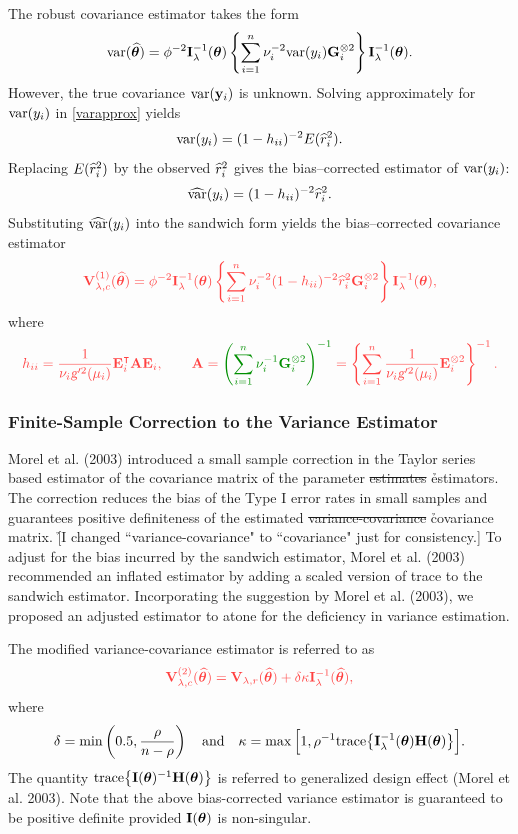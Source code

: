 The robust covariance estimator takes the form
\begin{equation*}
\text{var}(\widehat{\bm\theta}) 
= \phi^{-2}\mathbf{I}_\lambda^{-1}(\bm\theta)\left\{\sum_{i=1}^n \nu_i^{-2}\text{var}(y_i)\mathbf{G}_i^{\otimes 2}\right\}\mathbf{I}_\lambda^{-1}(\bm\theta). 
\label{eq: var-approx}
\end{equation*}
However, the true covariance $\text{var}(\mathbf{y}_i)$ is unknown. Solving approximately for $\text{var}(y_i)$ in \eqref{varapprox} yields
$$
\text{var}(y_i) = (1-h_{ii})^{-2}E(\widehat r_i^2).
$$
Replacing $E(\widehat r_i^2)$ by the observed $\widehat r_i^2$ gives the bias--corrected estimator of $\text{var}(y_i)$:
$$
\widehat{\text{var}}(y_i)= (1-h_{ii})^{-2}\widehat r_i^2.
$$
Substituting $\widehat{\text{var}}(y_i)$ into the sandwich form yields the bias--corrected covariance estimator
\begin{equation*}
	\x\BV_{\lambda,c}^{(1)}(\wh\Bt) 
= \phi^{-2}\BI_\lambda^{-1}(\Bt)\left\{\sum_{i=1}^n\nu_i^{-2}(1-h_{ii})^{-2}\wh r_i^2\BG_i^{\otimes 2}\right\}\BI_\lambda^{-1}(\Bt), \label{eq: var-approx}
\end{equation*}
where
$$
\x h_{ii} = \frac{1}{\nu_i\tg^{\prime 2} (\mu_i)}\BE_i^\p\BA\BE_i, 
\qquad \BA = {\h\left(\sum_{i=1}^n\nu_i^{-1}\BG_i^{\otimes 2}\right)^{-1}} = \left\{\sum_{i=1}^n\frac{1}{\nu_i\tg^{\prime 2} (\mu_i)}\BE_i^{\otimes 2}\right\}^{-1}.
$$

\subsubsection{Finite-Sample Correction to the Variance Estimator}
Morel et al. (2003) introduced a small sample correction in the Taylor series based estimator of the covariance matrix of the parameter \sout{estimates}
{\h estimators}. The correction reduces the bias of the Type I error rates in small samples and guarantees positive definiteness of the estimated 
\sout{variance-covariance} {\h covariance} 
matrix. {\h[I changed ``variance-covariance" to ``covariance" just for consistency.]}
To adjust for the bias incurred by the sandwich estimator, Morel et al. (2003)  recommended an inflated estimator by adding a scaled version of trace to the sandwich estimator. Incorporating the suggestion by Morel et al. (2003), we proposed an adjusted estimator to atone for the deficiency in  variance estimation. 

The modified variance-covariance estimator is referred to as 
\begin{align*}
	\x\BV_{\lambda,c}^{(2)}(\wh\Bt) = \BV_{\lambda,r}(\wh\Bt)+\delta\kappa\BI_\lambda^{-1}(\wh\Bt),
\end{align*}
where 
$$
\delta = \min\left(0.5,\frac{\rho}{n-\rho}\right)\quad \text{and} \quad \kappa = \max\Big[1,\rho^{-1}\mbox{trace}\big\{\mathbf{I}_\lambda^{-1}(\bm\theta)\mathbf{H}(\bm\theta)\big\}\Big].
$$
The quantity $\mbox{trace}\big\{\mathbf{I}(\bm\theta)^{-1}\mathbf{H}(\bm\theta)\big\}$ is referred to generalized design effect (Morel et al. 2003). Note that the above bias-corrected variance estimator is guaranteed to be positive definite provided $\mathbf{I}(\bm\theta)$ is non-singular. 

